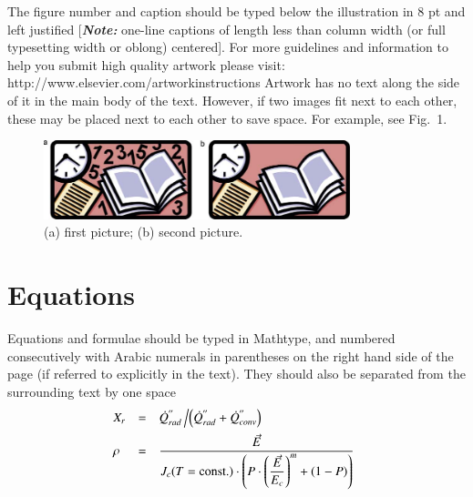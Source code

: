 \documentclass[3p,times,procedia,twocolumn,twoside]{elsarticle}
\begin{document}
The figure number and caption should be typed below the illustration
in 8 pt and left justified [{{\bfseries\itshape Note:}} one-line
captions of length less than column width (or full typesetting width
or oblong) centered]. For more guidelines and information to help you
submit high quality artwork please visit:
http://www.elsevier.com/artworkinstructions Artwork has no text along
the side of it in the main body of the text. However, if two images
fit next to each other, these may be placed next to each other to save
space. For example, see Fig.~1.

\begin{figure}[h]
\vspace*{10pt}
\centerline{\includegraphics[width=21pc]{gr1}}
\caption{(a) first picture; (b) second picture.}
\end{figure}

\pagebreak

\section{Equations}
Equations and formulae should be typed in Mathtype, and numbered
consecutively with Arabic numerals in parentheses on the right hand
side of the page (if referred to explicitly in the text). They should
also be separated from the surrounding text by one space
\begin{equation}
\begin{array}{@{}lcl}
\displaystyle X_r &=& \displaystyle\dot{Q}^{''}_{rad}\left/\left(\dot{Q}^{''}_{rad} + \dot{Q}^{''}_{conv}\right)\right.\\[6pt]
\displaystyle \rho &=& \displaystyle\frac{\vec{E}}{J_c(T={\rm const.})\cdot\left(P\cdot\left(\displaystyle\frac{\vec{E}}{E_c}\right)^m+(1-P)\right)}
\end{array}\vspace*{-12pt}
\end{equation}
\end{document}
